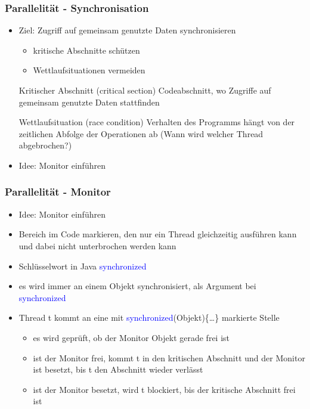 \documentclass[18pt]{beamer}
\begin{document}
	\begin{frame}
		\frametitle{Parallelität - Synchronisation}
		\begin{itemize}
			\item Ziel: Zugriff auf gemeinsam genutzte Daten synchronisieren \pause 
			\begin{itemize}
				\item kritische Abschnitte schützen \pause
				\item Wettlaufsituationen vermeiden
			\end{itemize}
			\begin{block}{Kritischer Abschnitt (critical section)}
				Codeabschnitt, wo Zugriffe auf gemeinsam genutzte Daten stattfinden
			\end{block} \pause
			\begin{block}{Wettlaufsituation (race condition)}
				Verhalten des Programms hängt von der zeitlichen Abfolge der Operationen ab (Wann wird welcher Thread abgebrochen?)
			\end{block} \pause
			\item Idee: Monitor einführen
		\end{itemize}
	\end{frame}

	\begin{frame}
		\frametitle{Parallelität - Monitor}
		\begin{itemize}
			\item Idee: Monitor einführen \pause
			\item Bereich im Code markieren, den nur ein Thread gleichzeitig ausführen kann und dabei nicht unterbrochen werden kann \pause
			\item Schlüsselwort in Java \textcolor{blue}{synchronized} \pause
			\item es wird immer an einem Objekt synchronisiert, als Argument bei \textcolor{blue}{synchronized} \pause
			\item Thread t kommt an eine mit \textcolor{blue}{synchronized}(Objekt)\{\dots\} markierte Stelle \pause
			\begin{itemize}
				\item es wird geprüft, ob der Monitor Objekt gerade frei ist \pause
				\item ist der Monitor frei, kommt t in den kritischen Abschnitt und der Monitor ist besetzt, bis t den Abschnitt wieder verlässt \pause
				\item ist der Monitor besetzt, wird t blockiert, bis der kritische Abschnitt frei ist
			\end{itemize}
		\end{itemize}
	\end{frame}
\end{document}
